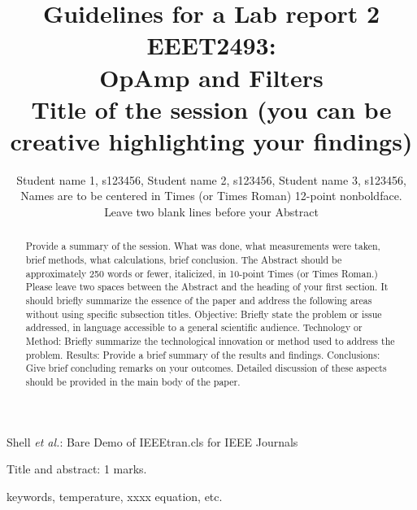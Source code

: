 \documentclass[journal]{IEEEtran}
\begin{document}
\title{Guidelines for a Lab report 2 EEET2493: \\ OpAmp and Filters\\ \small{Title of the session (you can be creative highlighting your findings)}}

\author{Student name 1, s123456,
        Student name 2, s123456,
        Student name 3, s123456,
        {\small Names are to be centered in Times 
(or Times Roman) 12-point nonboldface. Leave two blank lines before your Abstract}}%
        
{Shell \MakeLowercase{\textit{et al.}}: Bare Demo of IEEEtran.cls for IEEE Journals}

\maketitle

\begin{flushright} Title and abstract: 1 marks. \end{flushright}
\begin{abstract} Provide a summary of the session. What was done, 
what measurements were taken, brief methods, what calculations, brief conclusion.  The Abstract should be approximately 250 words or fewer, italicized, in 10-point Times (or Times Roman.) Please leave two spaces between the Abstract and the heading of your first section.
It should briefly summarize the essence of the paper and address the following areas without using specific subsection titles. Objective: Briefly state the problem or issue addressed, in language accessible to a general scientific audience. Technology or Method: Briefly summarize the technological innovation or method used to address the problem. Results: Provide a brief summary of the results and findings. Conclusions: Give brief concluding remarks on your outcomes. Detailed discussion of these aspects should be provided in the main body of the paper. 
\end{abstract}

\begin{IEEEkeywords}
keywords, temperature, xxxx equation, etc.
\end{IEEEkeywords}
\end{document}
